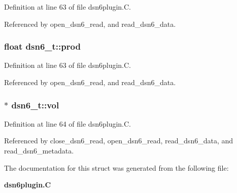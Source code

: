 Definition at line 63 of file dsn6plugin.C.

Referenced by open\_\-dsn6\_\-read, and read\_\-dsn6\_\-data.
\subsubsection{\setlength{\rightskip}{0pt plus 5cm}float dsn6\_\-t::prod}\label{structdsn6__t_m2}




Definition at line 63 of file dsn6plugin.C.

Referenced by open\_\-dsn6\_\-read, and read\_\-dsn6\_\-data.
\subsubsection{$\ast$ dsn6\_\-t::vol}\label{structdsn6__t_m4}




Definition at line 64 of file dsn6plugin.C.

Referenced by close\_\-dsn6\_\-read, open\_\-dsn6\_\-read, read\_\-dsn6\_\-data, and read\_\-dsn6\_\-metadata.

The documentation for this struct was generated from the following file:\begin{CompactItemize}
\item 
{\bf dsn6plugin.C}\end{CompactItemize}

